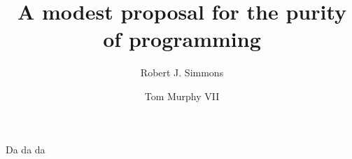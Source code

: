 \documentclass[acmtocl]%
{boviktrans}
\title{A modest proposal for the purity of programming}
\author{Robert J. Simmons \and Tom Murphy VII}
\begin{document}
\maketitle

Da da da
\end{document}
